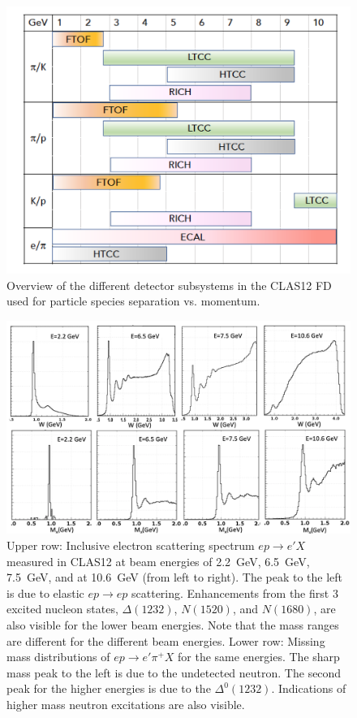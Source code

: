 \documentclass[final,3p]{elsarticle}
\begin{document}
\begin{twocolumn}
\begin{figure}[htp!]
\centerline{\includegraphics[width=1.0\columnwidth]{CLAS12-pid.png}}
\caption{Overview of the different detector subsystems in the CLAS12 FD used for particle species separation
  vs. momentum.}
\label{pid1}
\end{figure} 

\begin{figure}[t!]
\centerline{\includegraphics[width=2.0\columnwidth]{W-spectrum.png}}
\caption{Upper row: Inclusive electron scattering spectrum $ep \to e' X$ measured in CLAS12 at beam energies 
  of 2.2~GeV, 6.5~GeV, 7.5~GeV, and at 10.6~GeV (from left to right). The peak to the left is due to elastic
  $ep \to ep$ scattering. Enhancements from the first 3 excited nucleon states, $\Delta(1232)$, $N(1520)$,
  and $N(1680)$, are also visible for the lower beam energies. Note that the mass ranges  are different for the
  different beam energies. Lower row: Missing mass distributions of $ep\to e' \pi^+X$ for the same energies. The
  sharp mass peak to the left is due to the undetected neutron. The second peak for the higher energies is due to
  the $\Delta^0(1232)$. Indications of higher mass neutron excitations are also visible.} 
\label{spectrum}
\end{figure} 


\end{twocolumn}
\end{document}
